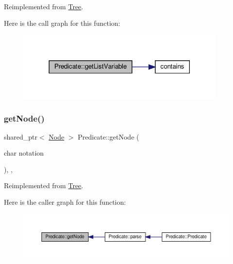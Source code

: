 Reimplemented from \hyperlink{class_tree_a525967d14a17de0ad9c9072b025af1c3}{Tree}.

Here is the call graph for this function\+:\nopagebreak
\begin{figure}[H]
\begin{center}
\leavevmode
\includegraphics[width=297pt]{d5/d30/class_predicate_ae2524ae4cd1e71a00984f6a49d717469_cgraph}
\end{center}
\end{figure}
\mbox{\label{class_predicate_a68cb341b481a973037db8d4b369bd73f}} 
\subsubsection{\texorpdfstring{get\+Node()}{getNode()}}
{\footnotesize\ttfamily shared\+\_\+ptr$<$ \hyperlink{class_node}{Node} $>$ Predicate\+::get\+Node (\begin{DoxyParamCaption}\item[{char}]{notation }\end{DoxyParamCaption})\hspace{0.3cm}{\ttfamily [override]}, {\ttfamily [private]}, {\ttfamily [virtual]}}



Reimplemented from \hyperlink{class_tree_a60a9b7d65fc663d2db005b01119efa73}{Tree}.

Here is the caller graph for this function\+:\nopagebreak
\begin{figure}[H]
\begin{center}
\leavevmode
\includegraphics[width=350pt]{d5/d30/class_predicate_a68cb341b481a973037db8d4b369bd73f_icgraph}
\end{center}
\end{figure}
\mbox{\label{class_predicate_a0572df9e18344e95ca1ce521d551a0ea}} 
